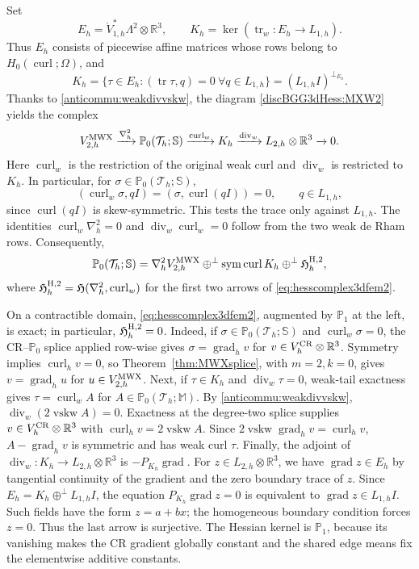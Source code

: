\documentclass[10pt]{amsart}
\numberwithin{equation}{section}
\newcommand{\curl}{\operatorname{curl}}
\renewcommand{\div}{\operatorname{div}}
\newcommand{\grad}{\operatorname{grad}}
\newcommand{\tr}{\operatorname{tr}}
\newcommand{\sym}{\operatorname{sym}}
\newcommand{\vskw}{\operatorname{vskw}}
\begin{document}
Set
\[
E_h=\mathring V_{1,h}^{*}\Lambda^2\otimes\mathbb R^3,
\qquad K_h=\ker(\tr_w:E_h\to L_{1,h}).
\]
Thus $E_h$ consists of piecewise affine matrices whose rows belong to
$H_0(\curl;\Omega)$, and
\[
K_h=\{\tau\in E_h:(\tr\tau,q)=0\ \forall q\in L_{1,h}\}
=(L_{1,h}I)^{\perp_{E_h}}.
\]
Thanks to \eqref{anticommu:weakdivvskw}, the diagram
\eqref{discBGG3dHess:MXW2} yields the complex
\begin{equation}\label{eq:hesscomplex3dfem2}
V_{2,h}^{\rm MWX}\xrightarrow{\nabla_h^2}
\mathbb P_0(\mathcal T_h;\mathbb S)\xrightarrow{\curl_w}
K_h\xrightarrow{\div_w}L_{2,h}\otimes\mathbb R^3\xrightarrow{}0.
\end{equation}
Here $\curl_w$ is the restriction of the original weak curl and $\div_w$
is restricted to $K_h$. In particular, for $\sigma\in\mathbb P_0(\mathcal T_h;\mathbb S)$,
\[
(\curl_w\sigma,qI)=(\sigma,\curl(qI))=0,\qquad q\in L_{1,h},
\]
since $\curl(qI)$ is skew-symmetric. This tests the trace only against
$L_{1,h}$. The identities $\curl_w\nabla_h^2=0$ and
$\div_w\curl_w=0$ follow from the two weak de Rham rows.
Consequently,
\[
\mathbb P_0(\mathcal T_h;\mathbb S)
=\nabla_h^2V_{2,h}^{\rm MWX}\oplus^\perp\sym\curl K_h
\oplus^\perp\mathfrak H_h^{\rm H,2},
\]
where $\mathfrak H_h^{\rm H,2}=\mathfrak H(\nabla_h^2,\curl_w)$
for the first two arrows of \eqref{eq:hesscomplex3dfem2}.

On a contractible domain, \eqref{eq:hesscomplex3dfem2}, augmented by
$\mathbb P_1$ at the left, is exact; in particular,
$\mathfrak H_h^{\rm H,2}=0$.
Indeed, if $\sigma\in\mathbb P_0(\mathcal T_h;\mathbb S)$ and
$\curl_w\sigma=0$, the CR--$\mathbb P_0$ splice applied row-wise gives
$\sigma=\grad_h v$ for $v\in V_h^{\rm CR}\otimes\mathbb R^3$.
Symmetry implies $\curl_hv=0$, so Theorem~\ref{thm:MWXsplice}, with
$m=2,k=0$, gives $v=\grad_hu$ for $u\in V_{2,h}^{\rm MWX}$.
Next, if $\tau\in K_h$ and $\div_w\tau=0$, weak-tail exactness gives
$\tau=\curl_w A$ for $A\in\mathbb P_0(\mathcal T_h;\mathbb M)$.
By \eqref{anticommu:weakdivvskw},
$\div_w(2\vskw A)=0$. Exactness at the degree-two splice supplies
$v\in V_h^{\rm CR}\otimes\mathbb R^3$ with
$\curl_hv=2\vskw A$. Since $2\vskw\grad_hv=\curl_hv$,
$A-\grad_hv$ is symmetric and has weak curl $\tau$.
Finally, the adjoint of $\div_w:K_h\to L_{2,h}\otimes\mathbb R^3$
is $-P_{K_h}\grad$. For $z\in L_{2,h}\otimes\mathbb R^3$,
we have $\grad z\in E_h$ by tangential continuity of the gradient
and the zero boundary trace of $z$. Since
$E_h=K_h\oplus^\perp L_{1,h}I$, the equation $P_{K_h}\grad z=0$
is equivalent to $\grad z\in L_{1,h}I$.
Such fields have the form $z=a+bx$;
the homogeneous boundary condition forces $z=0$. Thus the last arrow is
surjective. The Hessian kernel is $\mathbb P_1$, because its vanishing
makes the CR gradient globally constant and the shared edge means fix
the elementwise additive constants.
\end{document}
